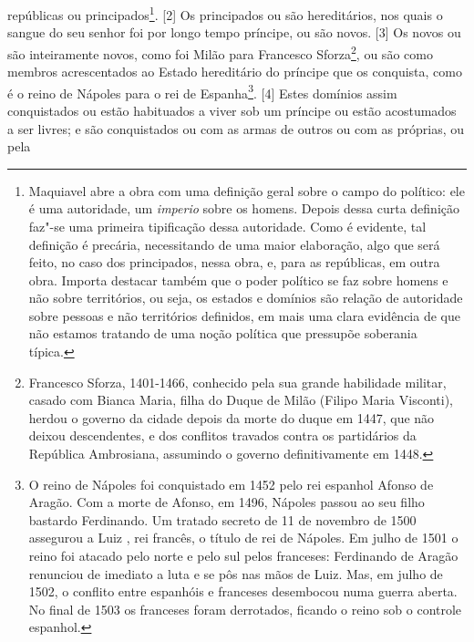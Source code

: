 repúblicas ou principados\footnote{Maquiavel abre a obra com uma
  definição geral sobre o campo do político: ele é uma autoridade, um
  \emph{imperio} sobre os homens. Depois dessa curta definição faz"-se
  uma primeira tipificação dessa autoridade. Como é evidente, tal
  definição é precária, necessitando de uma maior elaboração, algo que
  será feito, no caso dos principados, nessa obra, e, para as repúblicas, em
  outra obra. Importa destacar também que o poder político se faz sobre
  homens e não sobre territórios, ou seja, os estados e domínios são
  relação de autoridade sobre pessoas e não territórios definidos, em
  mais uma clara evidência de que não estamos tratando de uma noção
  política que pressupõe soberania típica.}. {[}2{]} Os principados ou
são hereditários, nos quais o sangue do seu senhor foi por longo tempo
príncipe, ou são novos. {[}3{]} Os novos ou são inteiramente novos, como
foi Milão para Francesco Sforza\footnote{Francesco Sforza, 1401-1466,
  conhecido pela sua grande habilidade militar, casado com Bianca Maria,
  filha do Duque de Milão (Filipo Maria Visconti), herdou o governo da
  cidade depois da morte do duque em 1447, que não deixou descendentes,
  e dos conflitos travados contra os partidários da República
  Ambrosiana, assumindo o governo definitivamente em 1448.}, ou são como
membros acrescentados ao Estado hereditário do príncipe que os
conquista, como é o reino de Nápoles para o rei de Espanha\footnote{O
  reino de Nápoles foi conquistado em 1452 pelo rei espanhol Afonso  de
  Aragão. Com a morte de Afonso, em 1496, Nápoles passou ao seu filho
  bastardo Ferdinando. Um tratado secreto de 11 de novembro de 1500
  assegurou a Luiz , rei francês, o título de rei de Nápoles. Em
  julho de 1501 o reino foi atacado pelo norte e pelo sul pelos
  franceses: Ferdinando  de Aragão renunciou de imediato a luta e se
  pôs nas mãos de Luiz. Mas, em julho de 1502, o conflito entre
  espanhóis e franceses desembocou numa guerra aberta. No final de 1503
  os franceses foram derrotados, ficando o reino sob o controle
  espanhol.}. {[}4{]} Estes domínios assim conquistados ou estão
habituados a viver sob um príncipe ou estão acostumados a ser livres; e
são conquistados ou com as armas de outros ou com as próprias, ou pela
